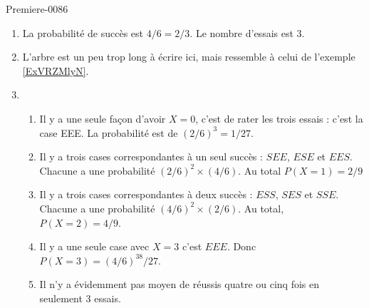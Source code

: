 
\begin{corrige}{Premiere-0086}

    \begin{enumerate}
        \item
            La probabilité de succès est \( 4/6=2/3\). Le nombre d'essais est \( 3\).
        \item
            L'arbre est un peu trop long à écrire ici, mais ressemble à celui de l'exemple \ref{ExVRZMlyN}.
        \item
            \begin{enumerate}
                \item
                    Il y a une seule façon d'avoir \( X=0\), c'est de rater les trois essais : c'est la case EEE. La probabilité est de \( (2/6)^3=1/27\).
                \item
                    Il y a trois cases correspondantes à un seul succès : \( SEE\), \( ESE\) et \( EES\). Chacune a une probabilité \( (2/6)^2\times (4/6)\). Au total \( P(X=1)=2/9\)
                \item
                    Il y a trois cases correspondantes à deux succès : \( ESS\), \( SES\) et \( SSE\). Chacune a une probabilité \( (4/6)^2\times (2/6)\). Au total, \( P(X=2)=4/9\).
                \item
                    Il y a une seule case avec \( X=3\) c'est \( EEE\). Donc \( P(X=3)=(4/6)^38/27\).
                \item
                    Il n'y a évidemment pas moyen de réussis quatre ou cinq fois en seulement 3 essais.
            \end{enumerate}
            
    \end{enumerate}

\end{corrige}
